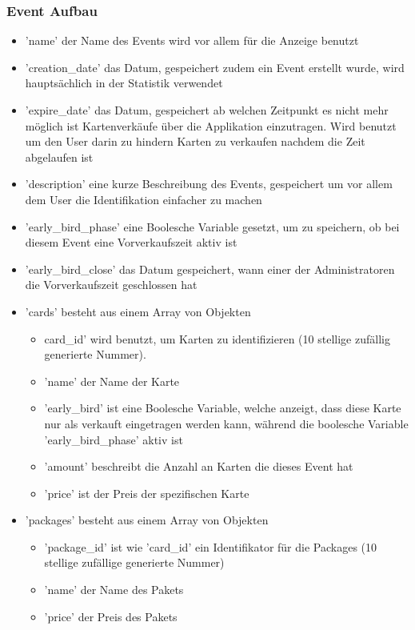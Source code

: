 \subsubsection{Event Aufbau}			
\begin{itemize}
	\item 'name' der Name des Events wird vor allem für die Anzeige benutzt
	\item 'creation\_date' das Datum, gespeichert zudem ein Event erstellt wurde, wird hauptsächlich in der Statistik verwendet
	\item 'expire\_date' das Datum, gespeichert ab welchen Zeitpunkt es nicht mehr möglich ist Kartenverkäufe über die Applikation einzutragen. Wird benutzt um den User darin zu hindern Karten zu verkaufen nachdem die Zeit abgelaufen ist
	\item 'description' eine kurze Beschreibung des Events, gespeichert um vor allem dem User die Identifikation einfacher zu machen
	\item 'early\_bird\_phase' eine Boolesche Variable gesetzt, um zu speichern, ob bei diesem Event eine Vorverkaufszeit aktiv ist
	\item 'early\_bird\_close' das Datum gespeichert, wann einer der Administratoren die Vorverkaufszeit geschlossen hat
	\item 'cards' besteht aus einem Array von Objekten
	\begin{itemize}
		\item card\_id' wird benutzt, um Karten zu identifizieren (10 stellige zufällig generierte Nummer). 
		\item 'name' der Name der Karte
		\item 'early\_bird' ist eine Boolesche Variable, welche anzeigt, dass diese Karte nur als verkauft eingetragen werden kann, während die boolesche Variable 'early\_bird\_phase' aktiv ist
		\item 'amount' beschreibt die Anzahl an Karten die dieses Event hat
		\item 'price' ist der Preis der spezifischen Karte
	\end{itemize}
	\item 'packages' besteht aus einem Array von Objekten
	\begin{itemize}
		\item 'package\_id' ist wie 'card\_id' ein Identifikator für die Packages (10 stellige zufällige generierte Nummer)
		\item 'name' der Name des Pakets
		\item 'price' der Preis des Pakets

\end{itemize}
\end{itemize}
